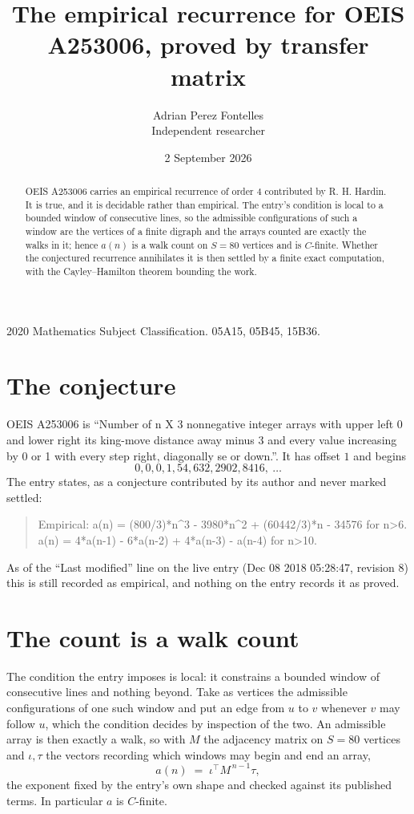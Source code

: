 \documentclass[11pt,a4paper]{article}
\title{The empirical recurrence for OEIS A253006, proved by transfer matrix}
\author{Adrian Perez Fontelles\\ \small Independent researcher}
\date{2 September 2026}
\theoremstyle{plain}
\theoremstyle{definition}
\begin{document}
\maketitle

\begin{abstract}
OEIS A253006 carries an empirical recurrence of order $4$ contributed by R. H. Hardin. It is
true, and it is decidable rather than empirical. The entry's condition is local to a bounded window of consecutive lines, so
the admissible configurations of such a window are the vertices of a finite digraph and the
arrays counted are exactly the walks in it; hence $a(n)$ is a walk count on $S=80$ vertices
and is $C$-finite. Whether the conjectured recurrence annihilates it is then settled by a
finite exact computation, with the Cayley--Hamilton theorem bounding the work.
\end{abstract}

\noindent\small 2020 Mathematics Subject Classification. 05A15, 05B45, 15B36.\normalsize

\section{The conjecture}

OEIS A253006 is ``Number of n X 3 nonnegative integer arrays with upper left 0 and lower right its king-move distance away minus 3 and every value increasing by 0 or 1 with every step right, diagonally se or down.''. It has offset $1$ and begins
\[
0, 0, 0, 1, 54, 632, 2902, 8416,\ \dots
\]
The entry states, as a conjecture contributed by its author and never marked settled:
\begin{quote}
Empirical: a(n) = (800/3)*n\^{}3 - 3980*n\^{}2 + (60442/3)*n - 34576 for n>6. a(n) = 4*a(n-1) - 6*a(n-2) + 4*a(n-3) - a(n-4) for n>10.
\end{quote}
As of the ``Last modified'' line on the live entry (Dec 08 2018 05:28:47, revision 8) this is still
recorded as empirical, and nothing on the entry records it as proved.

\section{The count is a walk count}

The condition the entry imposes is local: it constrains a bounded window of consecutive lines and nothing beyond. Take as
vertices the admissible configurations of one such window and put an edge from $u$ to $v$
whenever $v$ may follow $u$, which the condition decides by inspection of the two. An
admissible array is then exactly a walk, so with $M$ the adjacency matrix on $S=80$ vertices
and $\iota,\tau$ the vectors recording which windows may begin and end an array,
\[
a(n)\;=\;\iota^{\!\top}M^{\,n-1}\tau ,
\]
the exponent fixed by the entry's own shape and checked against its published terms. In
particular $a$ is $C$-finite.
\end{document}
